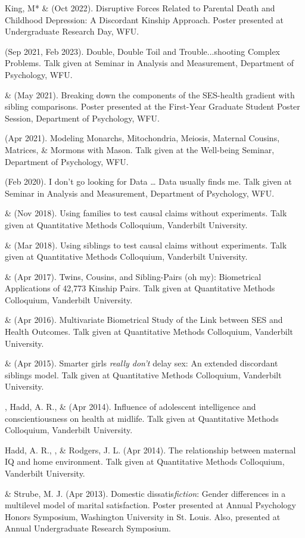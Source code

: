 \begin{etaremune}

\item King, M* \& \meb (Oct 2022). Disruptive Forces Related to Parental Death and Childhood Depression: A Discordant Kinship Approach. Poster presented at Undergraduate Research Day, WFU.

\item \meb (Sep 2021, Feb 2023). Double, Double Toil and Trouble...shooting Complex Problems. Talk given at Seminar in Analysis and Measurement, Department of Psychology, WFU. 
%
\item \yrh \& \meb (May 2021). Breaking down the components of the SES-health gradient with sibling comparisons. Poster presented at the First-Year Graduate Student Poster Session, Department of Psychology, WFU.
%
\item\meb (Apr 2021). Modeling Monarchs, Mitochondria, Meiosis, Maternal Cousins, Matrices, \& Mormons with Mason. Talk given at the Well-being Seminar, Department of Psychology, WFU. 
%
\item\meb (Feb 2020). I don't go looking for Data … Data usually finds me. Talk given at Seminar in Analysis and Measurement, Department of Psychology, WFU. 
%
\item\meb \& \Joe (Nov 2018). Using families to test causal claims without experiments. Talk given at Quantitative Methods Colloquium, Vanderbilt University. 
%
\item\meb \& \Joe (Mar 2018). Using siblings to test causal claims without experiments. Talk given at Quantitative Methods Colloquium, Vanderbilt University.
%
\item\meb \& \Joe (Apr 2017). Twins, Cousins, and Sibling-Pairs (oh my): Biometrical Applications of 42,773 Kinship Pairs. Talk given at Quantitative Methods Colloquium, Vanderbilt University. %
%
\item\meb \& \Joe (Apr 2016). Multivariate Biometrical Study of the Link between SES and Health Outcomes. Talk given at Quantitative Methods Colloquium, Vanderbilt University.
%
\item\meb \& \Joe (Apr 2015). Smarter girls \textit{really don't} delay sex: An extended discordant siblings model. Talk given at Quantitative Methods Colloquium, Vanderbilt University.
\item\meb, Hadd, A. R., \& \Joe (Apr 2014). Influence of adolescent intelligence and conscientiousness on health at midlife. Talk given at Quantitative Methods Colloquium, Vanderbilt University. 
%
\item Hadd, A. R., \meb, \& Rodgers, J. L. (Apr 2014). The relationship between maternal IQ and home environment. Talk given at Quantitative Methods Colloquium, Vanderbilt University.
%
\item\meb \& Strube, M. J. (Apr 2013). Domestic dissatis{\em fiction}: Gender differences in a multilevel model of marital satisfaction. Poster presented at Annual Psychology Honors Symposium, Washington University in St. Louis. Also, presented at Annual Undergraduate Research Symposium.
\end{etaremune}

